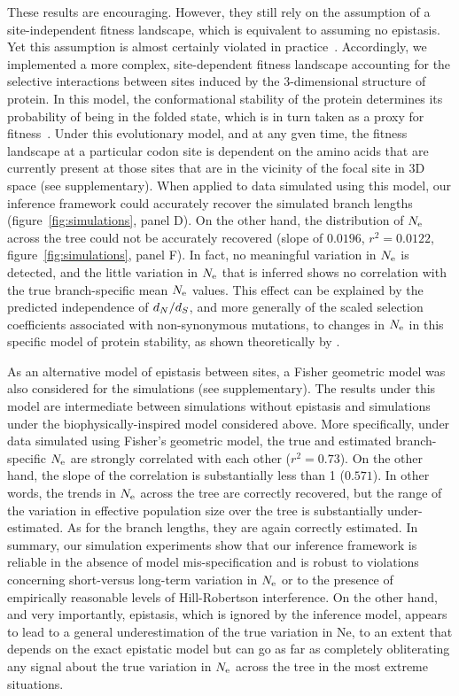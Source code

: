 \documentclass{MBE}
\begin{document}
	These results are encouraging.
	However, they still rely on the assumption of a site-independent fitness landscape, which is equivalent to assuming no epistasis.
	Yet this assumption is almost certainly violated in practice~\citep{Pollock2014,Shah2015}.
	Accordingly, we implemented a more complex, site-dependent fitness landscape accounting for the selective interactions between sites induced by the 3-dimensional structure of protein.
	In this model, the conformational stability of the protein determines its probability of being in the folded state, which is in turn taken as a proxy for fitness~\citep{Williams2006, Goldstein2011, Pollock2012}.
	Under this evolutionary model, and at any gven time, the fitness landscape at a particular {codon} site is dependent on the amino acids that are currently present at those sites that are in the vicinity of the focal site in 3D space (see supplementary).
	When applied to data simulated using this model, our inference framework could accurately recover the simulated branch lengths (figure~\ref{fig:simulations}, panel D).
	On the other hand, the distribution of $N_{\text{e}}$ across the tree could not be accurately recovered (slope of $0.0196$, $r^2 = 0.0122$, figure~\ref{fig:simulations}, panel F).
	In fact, no meaningful variation in $N_{\text{e}}$ is detected, and the little variation in $N_{\text{e}}$ that is inferred shows no correlation with the true branch-specific mean $N_{\text{e}}$ values.
	This effect can be explained by the predicted independence of $d_N / d_S$, and more generally of the scaled selection coefficients associated with {non-synonymous} mutations, to changes in $N_{\text{e}}$ in this specific model of protein stability, as shown theoretically by \citet{Goldstein2013}.

	As an alternative model of epistasis between sites, a Fisher geometric model was also considered for the simulations (see supplementary).
	The results under this model are intermediate between simulations without epistasis and simulations under the biophysically-inspired model considered above.
	More specifically, under data simulated using Fisher’s geometric model, the true and estimated branch-specific $N_{\text{e}}$ are strongly correlated with each other ($r^2 = 0.73$).
	On the other hand, the slope of the correlation is substantially less than 1 ($0.571$).
	In other words, the trends in $N_{\text{e}}$ across the tree are correctly recovered, but the range of the variation in {effective population size} over the tree is substantially under-estimated.
	As for the branch lengths, they are again correctly estimated.
	In summary, our simulation experiments show that our inference framework is reliable in the absence of model mis-specification and is robust to violations concerning short-versus long-term variation in $N_{\text{e}}$ or to the presence of empirically reasonable levels of Hill-Robertson interference.
	On the other hand, and very importantly, epistasis, which is ignored by the inference model, appears to lead to a general underestimation of the true variation in Ne, to an extent that depends on the exact epistatic model but can go as far as completely obliterating any signal about the true variation in $N_{\text{e}}$ across the tree in the most extreme situations.
\end{document}
